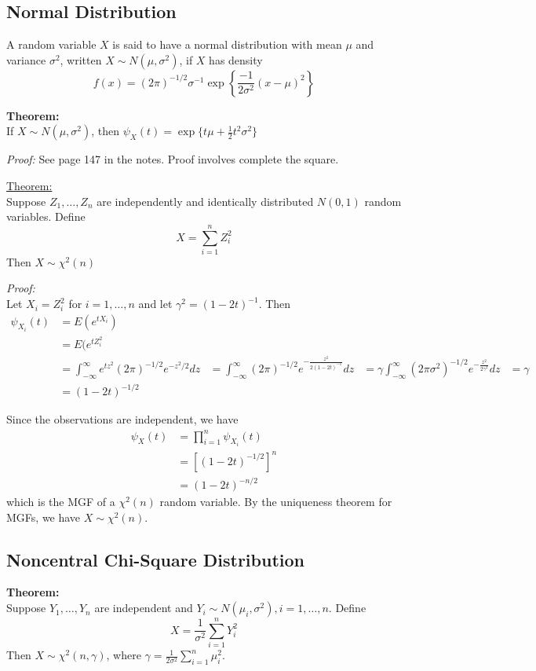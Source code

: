 \documentclass[12pt]{article}
\newcommand{\sumn}{\sum_{i=1}^n}
\numberwithin{equation}{section}
\begin{document}
\subsection{Normal Distribution}
A random variable $X$ is said to have a normal distribution with mean $\mu$ and variance $\sigma^2$, written $X \sim N(\mu, \sigma^2)$, if $X$ has density
\begin{equation*}
  f(x) = (2 \pi)^{-1/2} \sigma^{-1} \exp\left\{ 
    \frac{-1}{2\sigma^2} (x - \mu)^2
  \right\}
\end{equation*}

\textbf{Theorem:} \\
If $X \sim N(\mu, \sigma^2)$, then $\psi_X(t) = \exp\{ t\mu + \frac{1}{2} t^2 \sigma^2 \}$

\textit{Proof:}
See page 147 in the notes. Proof involves complete the square.

\underline{Theorem:} \\
Suppose $Z_1, \ldots, Z_n$ are independently and identically distributed $N(0, 1)$ random variables. Define
\begin{equation*}
  X = \sumn Z_i^2
\end{equation*}
Then $X \sim \chi^2(n)$

\textit{Proof:} \\
Let $X_i = Z_i^2$ for $i = 1, \ldots, n$ and let $\gamma^2 = (1 - 2t)^{-1}$. Then
\begin{align*}
  \psi_{X_i}(t) &= E(e^{tX_i}) \\
    &= E(e^{t Z_i^2} \\
    &= \int_{-\infty}^{\infty} 
      e^{tz^2} (2\pi)^{-1/2} e^{-z^2 / 2} 
      dz
    &= \int_{-\infty}^{\infty} 
       (2\pi)^{-1/2} e^{-\frac{z^2}{2 (1 - 2t)^{-1}}}
       dz
    &= \gamma \int_{-\infty}^{\infty} 
       (2\pi \sigma^2)^{-1/2} e^{-\frac{z^2}{2\gamma^2}}
       dz
    &= \gamma \\
    &= (1 - 2t)^{-1/2}
\end{align*}

Since the observations are independent, we have
\begin{align*}
  \psi_X(t) &= \prod_{i=1}^n \psi_{X_i}(t) \\
    &= [(1 - 2t)^{-1/2}]^{n} \\
    &= (1 - 2t)^{-n/2}
\end{align*}
which is the MGF of a $\chi^2(n)$ random variable. By the uniqueness theorem for MGFs, we have $X \sim \chi^2(n)$.

\subsection{Noncentral Chi-Square Distribution}
\textbf{Theorem:} \\
Suppose $Y_1, \ldots, Y_n$ are independent and 
$Y_i \sim N(\mu_i, \sigma^2), i = 1, \ldots, n$. Define
\begin{equation*}
  X = \frac{1}{\sigma^2} \sum_{i=1}^n Y_i^2
\end{equation*}
Then $X \sim \chi^2(n, \gamma)$, where $\gamma = \frac{1}{2\sigma^2} \sum_{i=1}^n \mu_i^2$.
\end{document}
